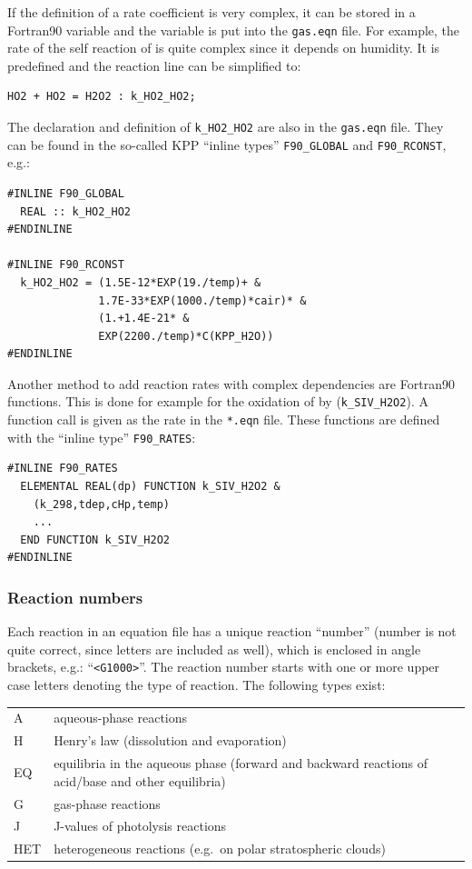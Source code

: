 \documentclass[twoside]{article}
\begin{document}
If the definition of a rate coefficient is very complex, it can be
stored in a Fortran90 variable and the variable is put into the
\verb|gas.eqn| file. For example, the rate of the self reaction of
 is quite complex since it depends on humidity. It is
predefined and the reaction line can be simplified to:
\begin{verbatim}
HO2 + HO2 = H2O2 : k_HO2_HO2;
\end{verbatim}
The declaration and definition of \verb|k_HO2_HO2| are also in the
\verb|gas.eqn| file. They can be found in the so-called KPP ``inline
types'' \verb|F90_GLOBAL| and \verb|F90_RCONST|, e.g.:
\begin{verbatim}
#INLINE F90_GLOBAL
  REAL :: k_HO2_HO2
#ENDINLINE

#INLINE F90_RCONST
  k_HO2_HO2 = (1.5E-12*EXP(19./temp)+ &
              1.7E-33*EXP(1000./temp)*cair)* &
              (1.+1.4E-21* &
              EXP(2200./temp)*C(KPP_H2O))
#ENDINLINE
\end{verbatim}

Another method to add reaction rates with complex dependencies are
Fortran90 functions. This is done for example for the oxidation of
 by  (\verb|k_SIV_H2O2|). A function call is
given as the rate in the \verb|*.eqn| file. These functions are defined
with the ``inline type'' \verb|F90_RATES|:
\begin{verbatim}
#INLINE F90_RATES
  ELEMENTAL REAL(dp) FUNCTION k_SIV_H2O2 &
    (k_298,tdep,cHp,temp)
    ...
  END FUNCTION k_SIV_H2O2
#ENDINLINE
\end{verbatim}

\subsubsection{Reaction numbers}
\label{sec:rxnnumbers}

Each reaction in an equation file has a unique reaction ``number''
(number is not quite correct, since letters are included as well), which
is enclosed in angle brackets, e.g.: ``\verb|<G1000>|''. The reaction
number starts with one or more upper case letters denoting the type of
reaction. The following types exist:

\begin{tabular}{lp{}}
  A   & aqueous-phase reactions\\
  H   & Henry's law (dissolution and evaporation)\\
  EQ  & equilibria in the aqueous phase (forward and backward reactions of
  acid/base and other equilibria)\\
  G   & gas-phase reactions\\
  J   & J-values of photolysis reactions\\
  HET & heterogeneous reactions (e.g.\ on polar stratospheric clouds)
\end{tabular}
\end{document}
